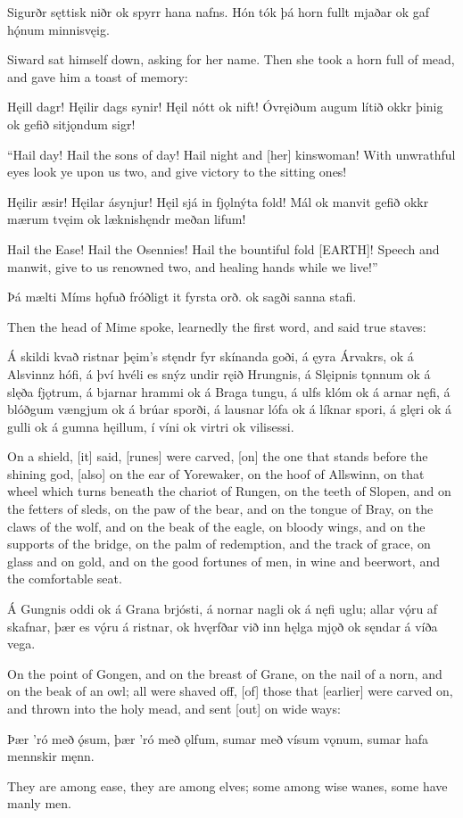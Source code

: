 Sigurðr sęttisk niðr ok spyrr hana nafns. Hón tók þá horn fullt mjaðar ok gaf hǫ́num minnisvęig. 

Siward sat himself down, asking for her name. Then she took a horn full of mead, and gave him a toast of memory:

Hęill dagr! \hld Hęilir dags synir!
\ind Hęil nótt ok nift!
Óvręiðum augum \hld lítið okkr þinig
\ind ok gefið sitjǫndum sigr! 

“Hail day! Hail the sons of day! Hail night and [her] kinswoman! With unwrathful eyes look ye upon us two, and give victory to the sitting ones!

Hęilir æsir! \hld Hęilar ásynjur!
\ind Hęil sjá in fjǫlnýta fold!
Mál ok manvit \hld gefið okkr mærum tvęim
\ind ok læknishęndr meðan lifum! 

Hail the Ease! Hail the Osennies! Hail the bountiful fold [EARTH]! Speech and manwit, give to us renowned two, and healing hands while we live!”

Þá mælti \hld Míms hǫfuð
\ind fróðligt it fyrsta orð.
\ind ok sagði sanna stafi. 

Then the head of Mime spoke, learnedly the first word, and said true staves:

Á skildi kvað ristnar \hld þęim’s stęndr fyr skínanda goði,
á ęyra Árvakrs, \hld ok á Alsvinnz hófi,
á því hvéli es snýz \hld undir ręið Hrungnis,
á Slęipnis tǫnnum \hld ok á slęða fjǫtrum,
á bjarnar hrammi \hld ok á Braga tungu,
á ulfs klóm \hld ok á arnar nęfi,
á blóðgum vængjum \hld ok á brúar sporði,
á lausnar lófa \hld ok á líknar spori,
á glęri ok á gulli \hld ok á gumna hęillum,
í víni ok virtri \hld ok vilisessi. 

On a shield, [it] said, [runes] were carved, [on] the one that stands before the shining god, [also] on the ear of Yorewaker, on the hoof of Allswinn, on that wheel which turns beneath the chariot of Rungen, on the teeth of Slopen, and on the fetters of sleds, on the paw of the bear, and on the tongue of Bray, on the claws of the wolf, and on the beak of the eagle, on bloody wings, and on the supports of the bridge, on the palm of redemption, and the track of grace, on glass and on gold, and on the good fortunes of men, in wine and beerwort, and the comfortable seat.

Á Gungnis oddi \hld ok á Grana brjósti,
á nornar nagli \hld ok á nęfi uglu;
allar vǫ́ru af skafnar, \hld þær es vǫ́ru á ristnar,
\ind ok hvęrfðar við inn hęlga mjǫð
\ind ok sęndar á víða vega. 

On the point of Gongen, and on the breast of Grane, on the nail of a norn, and on the beak of an owl; all were shaved off, [of] those that [earlier] were carved on, and thrown into the holy mead, and sent [out] on wide ways:

Þær ’ró með ǫ́sum, \hld þær ’ró með ǫlfum,
sumar með vísum vǫnum, \hld sumar hafa mennskir męnn. 

They are among ease, they are among elves; some among wise wanes, some have manly men.

